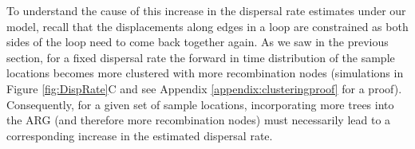 To understand the cause of this increase in the dispersal rate estimates under our model, recall that the displacements along edges in a loop are constrained as both sides of the loop need to come back together again. As we saw in the previous section, for a fixed dispersal rate the forward in time distribution of the sample locations becomes more clustered with more recombination nodes (simulations in Figure \ref{fig:DispRate}C and see Appendix \ref{appendix:clusteringproof} for a proof). Consequently, for a given set of sample locations, incorporating more trees into the ARG (and therefore more recombination nodes) must necessarily lead to a corresponding increase in the estimated dispersal rate. 

